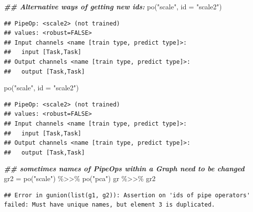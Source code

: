 \documentclass[
]{scrbook}
\newenvironment{Shaded}{\begin{snugshade}}{\end{snugshade}}
\newcommand{\AttributeTok}[1]{\textcolor[rgb]{0.77,0.63,0.00}{#1}}
\newcommand{\DocumentationTok}[1]{\textcolor[rgb]{0.56,0.35,0.01}{\textbf{\textit{#1}}}}
\newcommand{\FunctionTok}[1]{\textcolor[rgb]{0.00,0.00,0.00}{#1}}
\newcommand{\NormalTok}[1]{#1}
\newcommand{\OtherTok}[1]{\textcolor[rgb]{0.56,0.35,0.01}{#1}}
\newcommand{\SpecialCharTok}[1]{\textcolor[rgb]{0.00,0.00,0.00}{#1}}
\newcommand{\StringTok}[1]{\textcolor[rgb]{0.31,0.60,0.02}{#1}}
\renewenvironment{Shaded} {\begin{snugshade}\small} {\end{snugshade}}
\begin{document}
\begin{Shaded}
\begin{Highlighting}[]
\DocumentationTok{\#\# Alternative ways of getting new ids:}
\FunctionTok{po}\NormalTok{(}\StringTok{"scale"}\NormalTok{, }\AttributeTok{id =} \StringTok{"scale2"}\NormalTok{)}
\end{Highlighting}
\end{Shaded}

\begin{verbatim}
## PipeOp: <scale2> (not trained)
## values: <robust=FALSE>
## Input channels <name [train type, predict type]>:
##   input [Task,Task]
## Output channels <name [train type, predict type]>:
##   output [Task,Task]
\end{verbatim}

\begin{Shaded}
\begin{Highlighting}[]
\FunctionTok{po}\NormalTok{(}\StringTok{"scale"}\NormalTok{, }\AttributeTok{id =} \StringTok{"scale2"}\NormalTok{)}
\end{Highlighting}
\end{Shaded}

\begin{verbatim}
## PipeOp: <scale2> (not trained)
## values: <robust=FALSE>
## Input channels <name [train type, predict type]>:
##   input [Task,Task]
## Output channels <name [train type, predict type]>:
##   output [Task,Task]
\end{verbatim}

\begin{Shaded}
\begin{Highlighting}[]
\DocumentationTok{\#\# sometimes names of PipeOps within a Graph need to be changed}
\NormalTok{gr2 }\OtherTok{=} \FunctionTok{po}\NormalTok{(}\StringTok{"scale"}\NormalTok{) }\SpecialCharTok{\%\textgreater{}\textgreater{}\%} \FunctionTok{po}\NormalTok{(}\StringTok{"pca"}\NormalTok{)}
\NormalTok{gr }\SpecialCharTok{\%\textgreater{}\textgreater{}\%}\NormalTok{ gr2}
\end{Highlighting}
\end{Shaded}

\begin{verbatim}
## Error in gunion(list(g1, g2)): Assertion on 'ids of pipe operators' failed: Must have unique names, but element 3 is duplicated.
\end{verbatim}

\begin{Shaded}
\end{Shaded}
\end{document}

